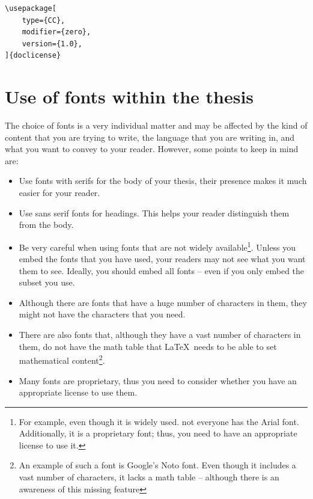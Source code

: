 \documentclass[main.tex]{subfiles}
\begin{document}
\begin{lstlisting}[style=latexExampleForAuthors]
\usepackage[
    type={CC},
    modifier={zero},
    version={1.0},
]{doclicense}
\end{lstlisting}

\section{Use of fonts within the thesis}
\label{sec:useOfFontsWithinThesis}

The choice of fonts is a very individual matter and may be affected by the kind of content that you are trying to write, the language that you are writing in, and what you want to convey to your reader. However, some points to keep in mind are:
\begin{itemize}
    \item Use fonts with serifs for the body of your thesis, their presence makes it much easier for your reader.

    \item Use sans serif fonts for headings. This helps your reader distinguish them from the body.

    \item Be very careful when using fonts that are not widely available\footnote{For example, even though it is widely used. not everyone has the Arial font. Additionally, it is a proprietary font; thus, you need to have an appropriate license to use it.}. Unless you embed the fonts that you have used, your readers may not see what you want them to see. Ideally, you should embed all fonts -- even if you only embed the subset you use.

    \item Although there are fonts that have a huge number of characters in them, they might not have the characters that you need.

    \item There are also fonts that, although they have a vast number of characters in them, do not have the math table that \LaTeX\ needs to be able to set mathematical content\footnote{An example of such a font is Google's Noto font. Even though it includes a vast number of characters, it lacks a math table -- although there is an awareness of this missing feature}.

    \item Many fonts are proprietary, thus you need to consider whether you have an appropriate license to use them.
\end{itemize}
\end{document}
